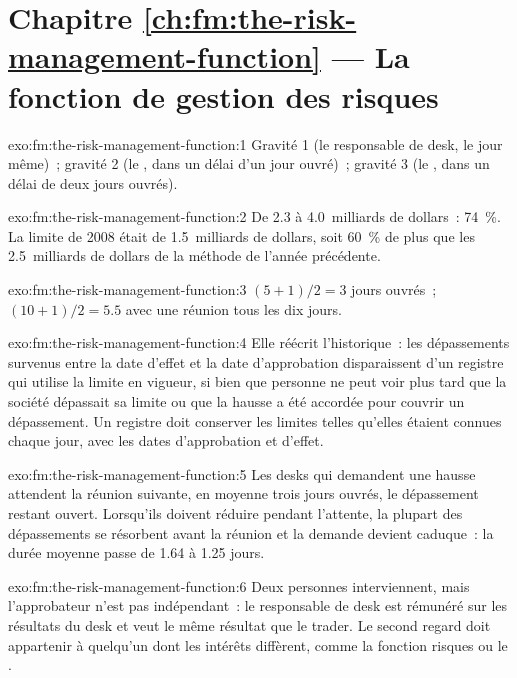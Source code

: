 \section*{Chapitre \ref{ch:fm:the-risk-management-function} --- La fonction de gestion des risques}

\begin{solution}{exo:fm:the-risk-management-function:1}
Gravité 1 (le responsable de desk, le jour même)~; gravité 2 (le , dans un délai d'un jour ouvré)~; gravité 3 (le , dans
un délai de deux jours ouvrés).
\end{solution}

\begin{solution}{exo:fm:the-risk-management-function:2}
De 2.3 à 4.0~milliards de dollars~: 74~\%. La limite de 2008 était de 1.5~milliards de dollars, soit 60~\% de plus que les 2.5~milliards de dollars de la méthode de l'année précédente.
\end{solution}

\begin{solution}{exo:fm:the-risk-management-function:3}
$(5+1)/2=3$ jours ouvrés~; $(10+1)/2=5.5$ avec une réunion tous les dix jours.
\end{solution}

\begin{solution}{exo:fm:the-risk-management-function:4}
Elle réécrit l'historique~: les dépassements survenus entre la date d'effet et la date d'approbation disparaissent d'un registre qui utilise la limite en vigueur, si bien
que personne ne peut voir plus tard que la société dépassait sa limite ou que la hausse a été accordée pour couvrir un dépassement. Un registre doit conserver les limites telles qu'elles étaient connues
chaque jour, avec les dates d'approbation et d'effet.
\end{solution}

\begin{solution}{exo:fm:the-risk-management-function:5}
Les desks qui demandent une hausse attendent la réunion suivante, en moyenne trois jours ouvrés, le dépassement restant ouvert. Lorsqu'ils doivent réduire pendant
l'attente, la plupart des dépassements se résorbent avant la réunion et la demande devient caduque~: la durée moyenne passe de 1.64 à 1.25 jours.
\end{solution}

\begin{solution}{exo:fm:the-risk-management-function:6}
Deux personnes interviennent, mais l'approbateur n'est pas indépendant~: le responsable de desk est rémunéré sur les résultats du desk et veut le même résultat que le
trader. Le second regard doit appartenir à quelqu'un dont les intérêts diffèrent, comme la fonction risques ou le .
\end{solution}

